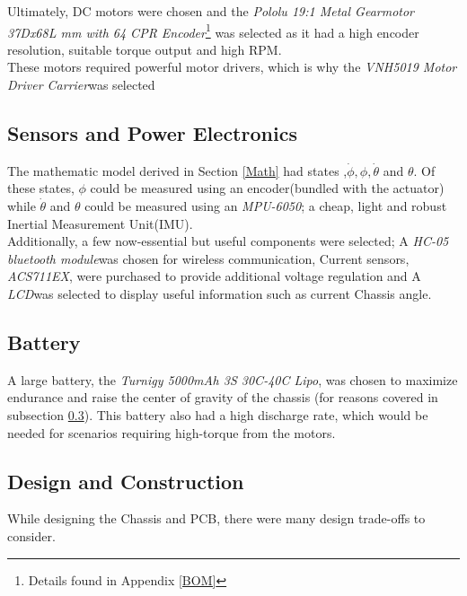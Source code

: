 \documentclass{UoNMCHA}
\numberwithin{equation}{section}
\begin{document}
Ultimately, DC motors were chosen and the \textit{Pololu 19:1 Metal Gearmotor 37Dx68L mm with 64 CPR Encoder}\footnote{Details found in Appendix \ref{BOM}} was selected as it had a high encoder resolution, suitable torque output and high RPM. \\ 
These motors required powerful motor drivers, which is why the \textit{VNH5019 Motor Driver Carrier}\footnotemark[\value{footnote}] was selected

\subsection{Sensors and Power Electronics}

The mathematic model derived in Section \ref{Math} had states ,$\dot{\phi}, \phi,  \dot{\theta}$ and $\theta$. Of these states, $\phi$ could be measured using an encoder(bundled with the actuator) while $\dot{\theta}$ and $\theta$ could be measured using an \textit{MPU-6050}\footnotemark[\value{footnote}]; a cheap, light and robust Inertial Measurement Unit(IMU). \\

Additionally, a few now-essential but useful components were selected; A  \textit{HC-05 bluetooth module}\footnotemark[\value{footnote}] was chosen for wireless communication, Current sensors, \textit{ACS711EX}\footnotemark[\value{footnote}] , were  purchased to provide additional voltage regulation and A \textit{LCD}\footnotemark[\value{footnote}] was selected to display useful information such as current Chassis angle. 

\subsection{Battery}

A large battery, the \textit{Turnigy 5000mAh 3S 30C-40C Lipo}\footnotemark[\value{footnote}], was chosen to maximize endurance and raise the center of gravity of the chassis (for reasons covered in subsection \ref{design}). This battery also had a high discharge rate, which would be needed for scenarios requiring high-torque from the motors.

\subsection{Design and Construction}\label{design}

While designing the Chassis and PCB, there were many design trade-offs to consider.
\end{document}
